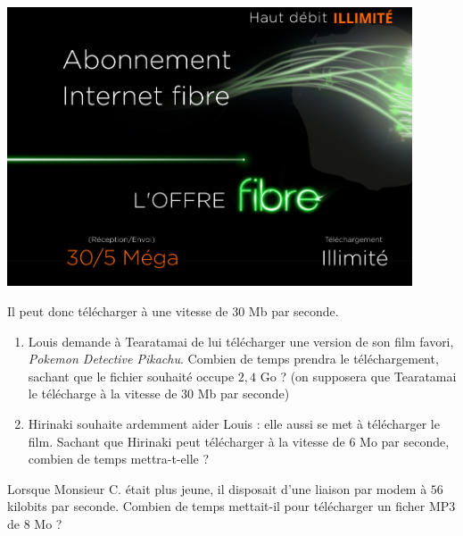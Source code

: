 \documentclass[a4paper]{article}
\begin{document}
\begin{center}
  \includegraphics[width=12cm]{evaluation_2_seconde_15_sujet_A_viti_fibre.png}
\end{center}

Il peut donc télécharger à une vitesse de $30$ Mb par seconde.

\begin{enumerate}
  \item Louis demande à Tearatamai de lui télécharger une version de son film favori, \textit{Pokemon Detective Pikachu}. Combien de temps prendra le téléchargement, sachant que le fichier souhaité occupe $2,4$ Go ? (on supposera que Tearatamai le télécharge à la vitesse de $30$ Mb par seconde)
  \item Hirinaki souhaite ardemment aider Louis : elle aussi se met à télécharger le film. Sachant que Hirinaki peut télécharger à la vitesse de $6$ Mo par seconde, combien de temps mettra-t-elle ?
\end{enumerate}

\bigskip

\exo[2 points]\vspace*{-2mm}
Lorsque Monsieur C. était plus jeune, il disposait d'une liaison par modem à $56$ kilobits par seconde. Combien de temps mettait-il pour télécharger un ficher MP3 de $8$ Mo ?
\end{document}
